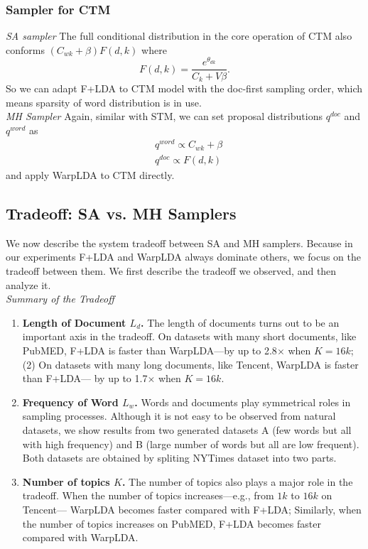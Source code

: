 \documentclass[10pt,journal,cspaper,compsoc]{IEEEtran}
\begin{document}
	\subsubsection{Sampler for CTM}
	\noindent
	{\large \em SA sampler} The full conditional distribution in the core operation of CTM also conforms $(C_{wk}+\beta)F(d,k)$ where
	$$
	F(d,k)=\frac{e^{\theta_{dk}}}{C_k+V\beta}.
	$$
	So we can adapt F+LDA to CTM model with the doc-first sampling order, which means sparsity of word distribution is in use. \\
	
    \noindent
    {\large \em MH Sampler} Again, similar with STM, we can set proposal distributions
	$q^{doc}$ and $q^{word}$ as
	\begin{align*}
    &q^{word} \propto C_{wk}+\beta\\
    &q^{doc} \propto F(d,k)
    \end{align*}
    and apply WarpLDA to CTM directly.
    
	\subsection{Tradeoff: SA vs. MH Samplers}
	We now describe the system tradeoff between SA
	and MH samplers. Because in our experiments
	F+LDA and WarpLDA always dominate others,
	we focus on the tradeoff between them.
	We first describe the tradeoff we observed, and
	then analyze it.
	\\

    \noindent
	{\large \em Summary of the Tradeoff}
	\begin{enumerate}
		\item \textbf{Length of Document $L_d$.}
		The length of documents turns out to be
		an important axis in the tradeoff. On
		datasets with many short
		documents, like PubMED, F+LDA
		is faster than WarpLDA---by up to 2.8$\times$ when $K = 16k$;
		(2) On datasets with many long
		documents, like Tencent,
		WarpLDA is faster than F+LDA---
		by up to 1.7$\times$ when $K = 16k$.
		
		\item \textbf{Frequency of Word $L_w$.} Words
		and documents play symmetrical roles in sampling
		processes. Although it is not easy to be observed 
		from natural datasets, we show results from two
		generated datasets A (few words but all with high frequency) and B (large number of words but all are low frequent). Both datasets are obtained by spliting NYTimes dataset into two
		parts.
		
		\item \textbf{Number of topics $K$.}
		The number of topics also plays a major role
		in the tradeoff. When the number of topics
		increases---e.g., from $1k$ to $16k$ on Tencent---
		WarpLDA becomes faster compared with F+LDA;
		Similarly, when the number of topics
		increases on PubMED, F+LDA becomes
		faster compared with WarpLDA.
	\end{enumerate}
	\\
	
\end{document}
